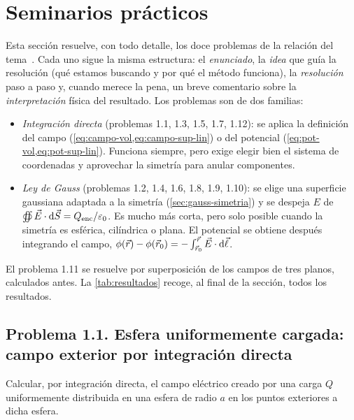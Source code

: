 \section{Seminarios prácticos}\label{sec:seminarios}
Esta sección resuelve, con todo detalle, los doce problemas de la relación del tema~\cite{PROBLEMAS-T1}. Cada uno sigue la misma estructura: el
\emph{enunciado}, la \emph{idea} que guía la resolución (qué estamos buscando y por qué el método funciona), la \emph{resolución} paso a paso
y, cuando merece la pena, un breve comentario sobre la \emph{interpretación} física del resultado. Los problemas son de dos familias:
\begin{itemize}
  \item \emph{Integración directa} (problemas 1.1, 1.3, 1.5, 1.7, 1.12): se aplica la definición del campo (\cref{eq:campo-vol,eq:campo-sup-lin}) o del potencial
        (\cref{eq:pot-vol,eq:pot-sup-lin}). Funciona siempre, pero exige elegir bien el sistema de coordenadas y aprovechar la simetría para anular componentes.
  \item \emph{Ley de Gauss} (problemas 1.2, 1.4, 1.6, 1.8, 1.9, 1.10): se elige una superficie gaussiana adaptada a la simetría (\cref{sec:gauss-simetria}) y se despeja $E$ de
        $\oiint\vec{E}\cdot\mathrm{d}\vec{S}=Q_{\mathrm{enc}}/\varepsilon_{0}$. Es mucho más corta, pero solo posible cuando la simetría es esférica, cilíndrica o plana. El potencial se obtiene después
        integrando el campo, $\phi(\vec{r})-\phi(\vec{r}_0)=-\int_{\vec{r}_0}^{\vec{r}}\vec{E}\cdot\mathrm{d}\vec{\ell}$.
\end{itemize}
El problema 1.11 se resuelve por superposición de los campos de tres planos, calculados antes. La \cref{tab:resultados} recoge, al final de la sección, todos los resultados.

\subsection{Problema 1.1. Esfera uniformemente cargada: campo exterior por integración directa}\label{sem:esfera-directa}
\begin{ejercicio}\label{ejer:esfera-directa}
Calcular, por integración directa, el campo eléctrico creado por una carga $Q$ uniformemente distribuida en una esfera de radio $a$ en los puntos exteriores a dicha esfera.
\end{ejercicio}

